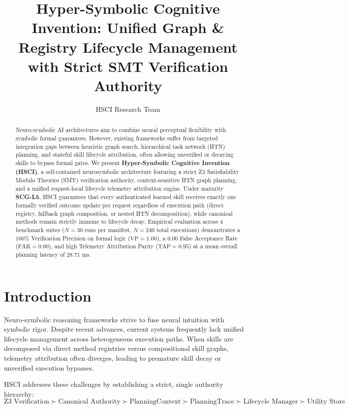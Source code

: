 \documentclass[letterpaper]{article}
\title{Hyper-Symbolic Cognitive Invention: Unified Graph \& Registry Lifecycle Management with Strict SMT Verification Authority}
\author{
    HSCI Research Team
}
\begin{document}
\maketitle

\begin{abstract}
Neuro-symbolic AI architectures aim to combine neural perceptual flexibility with symbolic formal guarantees. However, existing frameworks suffer from targeted integration gaps between heuristic graph search, hierarchical task network (HTN) planning, and stateful skill lifecycle attribution, often allowing unverified or decaying skills to bypass formal gates. We present \textbf{Hyper-Symbolic Cognitive Invention (HSCI)}, a self-contained neurosymbolic architecture featuring a strict Z3 Satisfiability Modulo Theories (SMT) verification authority, context-sensitive HTN graph planning, and a unified request-local lifecycle telemetry attribution engine. Under maturity \textbf{SCG-L5}, HSCI guarantees that every authenticated learned skill receives exactly one formally verified outcome update per request regardless of execution path (direct registry, fallback graph composition, or nested HTN decomposition), while canonical methods remain strictly immune to lifecycle decay. Empirical evaluation across 4 benchmark suites ($N=30$ runs per manifest, $N=240$ total executions) demonstrates a 100\% Verification Precision on formal logic ($\text{VP} = 1.00$), a 0.00 False Acceptance Rate ($\text{FAR} = 0.00$), and high Telemetry Attribution Parity ($\text{TAP} = 0.95$) at a mean overall planning latency of $28.71\text{ ms}$.
\end{abstract}

\section{Introduction}
Neuro-symbolic reasoning frameworks strive to fuse neural intuition with symbolic rigor. Despite recent advances, current systems frequently lack unified lifecycle management across heterogeneous execution paths. When skills are decomposed via direct method registries versus compositional skill graphs, telemetry attribution often diverges, leading to premature skill decay or unverified execution bypasses.

HSCI addresses these challenges by establishing a strict, single authority hierarchy:
\begin{equation}
\text{Z3 Verification} \succ \text{Canonical Authority} \succ \text{PlanningContext} \succ \text{PlanningTrace} \succ \text{Lifecycle Manager} \succ \text{Utility Store}
\end{equation}
\end{document}
